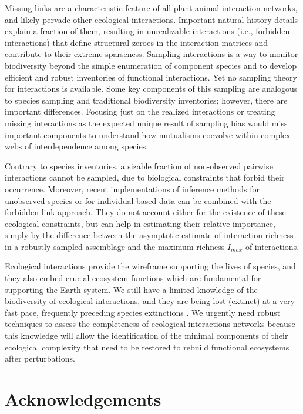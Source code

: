 \documentclass[12pt]{article}
\begin{document}
Missing links are a characteristic feature of all plant-animal interaction networks, and likely pervade other ecological interactions. Important natural history details explain a fraction of them, resulting in unrealizable interactions (i.e., forbidden interactions) that define structural zeroes in the interaction matrices and contribute to their extreme sparseness. Sampling interactions is a way to monitor biodiversity beyond the simple enumeration of component species and to develop efficient and robust inventories of functional interactions. Yet no sampling theory for interactions is available. Some key components of this sampling are analogous to species sampling and traditional biodiversity inventories; however, there are important differences. Focusing just on the realized interactions or treating missing interactions as the expected unique result of sampling bias would miss important components to understand how mutualisms coevolve within complex webs of interdependence among species. 

Contrary to species inventories, a sizable fraction of non-observed pairwise interactions cannot be sampled, due to biological constraints that forbid their occurrence. Moreover, recent implementations of inference methods for unobserved species \citep{Chao:2015tc} or for individual-based data \citep{Wells:2012dy} can be combined with the forbidden link approach. They do not account either for the existence of these ecological constraints, but can help in estimating their relative importance, simply by the difference between the asymptotic estimate of interaction richness in a robustly-sampled assemblage and the maximum richness $I_{max}$ of interactions. 

Ecological interactions provide the wireframe supporting the lives of species, and they also embed crucial ecosystem functions which are fundamental for supporting the Earth system. We still have a limited knowledge of the biodiversity of ecological interactions, and they are being lost (extinct) at a very fast pace, frequently preceding species extinctions \citep{ValienteBanuet:2014bw}. We urgently need robust techniques to assess the completeness of ecological interactions networks because this knowledge will allow the identification of the minimal components of their ecological complexity that need to be restored to rebuild functional ecosystems after perturbations.

\section*{Acknowledgements}
\label{acknowledgements.}
\end{document}
